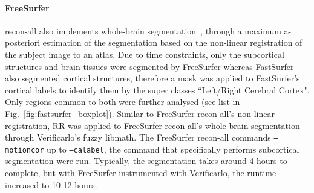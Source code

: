 \paragraph{FreeSurfer} recon-all also implements whole-brain segmentation~\cite{fischl2002whole}, through a maximum a-posteriori estimation of the segmentation based on the non-linear registration of the subject image to an atlas.
Due to time constraints, only the subcortical structures and brain tissues were segmented  by FreeSurfer whereas FastSurfer also segmented cortical structures, therefore a mask was applied to FastSurfer's cortical labels to identify them by the super classes ``Left/Right Cerebral Cortex". Only regions common to both were further analysed (see list in Fig.~\ref{fig:fastsurfer_boxplot}).
Similar to FreeSurfer recon-all's non-linear registration, RR was applied to FreeSurfer recon-all's whole brain segmentation through Verificarlo's fuzzy libmath.
The FreeSurfer recon-all commands \texttt{--motioncor} up to \texttt{--calabel}, the command that specifically performs subcortical segmentation were run. 
Typically, the segmentation takes around 4 hours to complete, but with FreeSurfer instrumented with Verificarlo, the runtime increased to 10-12 hours.



